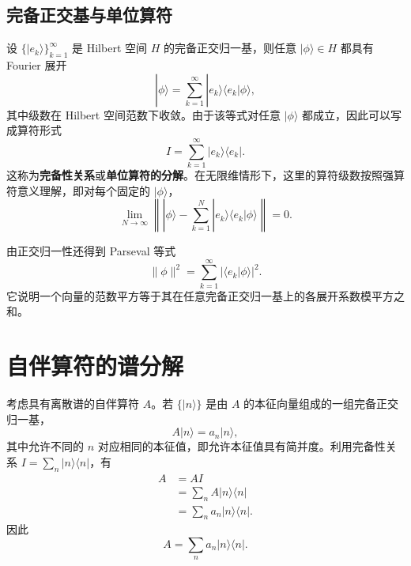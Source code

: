 \documentclass[UTF8,a4paper,11pt,openany]{ctexbook}
\begin{document}
\subsection{完备正交基与单位算符}

设 $\{|e_k\rangle\}_{k=1}^{\infty}$ 是 Hilbert 空间 $H$ 的完备正交归一基，则任意 $|\phi\rangle\in H$ 都具有 Fourier 展开
\begin{equation}
    |\phi\rangle
    =
    \sum_{k=1}^{\infty}
    |e_k\rangle
    \langle e_k|\phi\rangle,
\end{equation}
其中级数在 Hilbert 空间范数下收敛。由于该等式对任意 $|\phi\rangle$ 都成立，因此可以写成算符形式
\begin{equation}
    \boxed{
    I
    =
    \sum_{k=1}^{\infty}
    |e_k\rangle\langle e_k|
    }.
\end{equation}
这称为\textbf{完备性关系}或\textbf{单位算符的分解}。在无限维情形下，这里的算符级数按照强算符意义理解，即对每个固定的 $|\phi\rangle$，
\begin{equation}
    \lim_{N\to\infty}
    \left\|
        |\phi\rangle
        -
        \sum_{k=1}^{N}
        |e_k\rangle\langle e_k|\phi\rangle
    \right\|
    =
    0.
\end{equation}

由正交归一性还得到 Parseval 等式
\begin{equation}
    \boxed{
    \|\phi\|^2
    =
    \sum_{k=1}^{\infty}
    |\langle e_k|\phi\rangle|^2
    }.
\end{equation}
它说明一个向量的范数平方等于其在任意完备正交归一基上的各展开系数模平方之和。

\section{自伴算符的谱分解}

考虑具有离散谱的自伴算符 $A$。若 $\{|n\rangle\}$ 是由 $A$ 的本征向量组成的一组完备正交归一基，
\begin{equation}
    A|n\rangle
    =
    a_n|n\rangle,
\end{equation}
其中允许不同的 $n$ 对应相同的本征值，即允许本征值具有简并度。利用完备性关系
$I=\sum_n|n\rangle\langle n|$，有
\begin{align}
    A
    &=
    AI
    \nonumber\\
    &=
    \sum_n
    A|n\rangle\langle n|
    \nonumber\\
    &=
    \sum_n
    a_n|n\rangle\langle n|.
\end{align}
因此
\begin{equation}
    \boxed{
    A
    =
    \sum_n
    a_n|n\rangle\langle n|
    }.
\end{equation}
\end{document}
